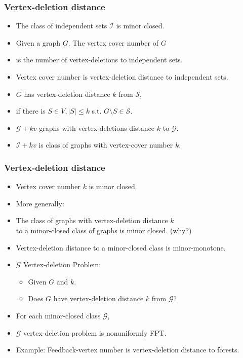 \documentclass[t,usenames,dvipsnames]{beamer}
\begin{document}
\begin{frame}\frametitle{Vertex-deletion distance}
	\begin{itemize}[<+->]
		\item The class of independent sets $\mathcal{I}$ is minor closed.
		\item Given a graph $G$. The vertex cover number of $G$
		\item[] \hspace{1cm} is the number of vertex-deletions to independent sets.
		\item Vertex cover number is vertex-deletion distance to independent sets.
		\item $G$ has vertex-deletion distance $k$ from $\mathcal{S}$,
		\item[] \hspace{1cm} if there is $S \in V, |S| \leq k$ s.t. $G \setminus S \in
			\mathcal{S}$.
		\item $\mathcal{G} + k v$ graphs with vertex-deletions distance $k$ to
			$\mathcal{G}$.
		\item $\mathcal{I} + k v$ is class of graphs with vertex-cover number $k$.
	\end{itemize}
\end{frame}
\begin{frame}\frametitle{Vertex-deletion distance}
	\begin{itemize}[<+->]
		\item Vertex cover number $k$ is minor closed.
		\item More generally:
		\item[] The class of graphs with vertex-deletion distance $k$\\
			to a minor-closed class of graphs is minor closed. (why?)
		\item Vertex-deletion distance to a minor-closed class is minor-monotone.

		\item $\mathcal{G}$ Vertex-deletion Problem:
			\begin{itemize}
				\item Given $G$ and $k$.
				\item Does $G$ have vertex-deletion distance $k$ from $\mathcal{G}$?
			\end{itemize}
		\item For each minor-closed class $\mathcal{G}$, 
		\item[] \hspace{1cm} $\mathcal{G}$ vertex-deletion problem is nonuniformly FPT.
		\item Example: Feedback-vertex number is vertex-deletion distance to forests.
	\end{itemize}
\end{frame}
\end{document}
